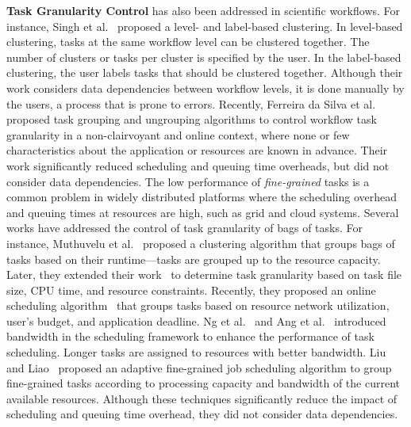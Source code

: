 \textbf{Task Granularity Control} has also been addressed in scientific workflows. For instance, Singh et al.~\cite{Singh2008} proposed a level- and label-based clustering. In level-based clustering, tasks at the same workflow level can be clustered together. The number of clusters or tasks per cluster is specified by the user. In the label-based clustering, the user labels tasks that should be clustered together. Although their work considers data dependencies between workflow levels, it is done manually by the users, a process that is prone to errors. Recently, Ferreira da Silva et al.~\cite{Ferreira-granularity-2013} proposed task grouping and ungrouping algorithms to control workflow task granularity in a non-clairvoyant and online context, where none or few characteristics about the application or resources are known in advance. Their work significantly reduced scheduling and queuing time overheads, but did not consider data dependencies. The low performance of \emph{fine-grained} tasks is a common problem in widely distributed platforms where the scheduling overhead and queuing times at resources are high, such as grid and cloud systems. Several works have addressed the control of task granularity of bags of tasks. For instance, Muthuvelu et al.~\cite{Muthuvelu2005} proposed a clustering algorithm that groups bags of tasks based on their runtime---tasks are grouped up to the resource capacity. Later, they extended their work~\cite{4493929} to determine task granularity based on task file size, CPU time, and resource constraints. Recently, they proposed an online scheduling algorithm~\cite{Muthuvelu2010,Muthuvelu2013} that groups tasks based on resource network utilization, user's budget, and application deadline. Ng et al.~\cite{Keat2006} and Ang et al.~\cite{Ang2009} introduced bandwidth in the scheduling framework to enhance the performance of task scheduling. Longer tasks are assigned to resources with better bandwidth. Liu and Liao~\cite{Liu2009} proposed an adaptive fine-grained job scheduling algorithm to group fine-grained tasks according to processing capacity and bandwidth of the current available resources. Although these techniques significantly reduce the impact of scheduling and queuing time overhead, they did not consider data dependencies.

